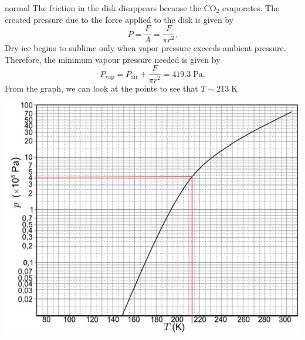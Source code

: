 \begin{solution}{normal}
The friction in the disk disappears because the $\text{CO}_2$ evaporates. The created pressure due to the force applied to the disk is given by 
\[P = \frac{F}{A} = \frac{F}{\pi r^2}.\]
Dry ice begins to sublime only when vapor pressure exceeds ambient pressure. Therefore, the minimum vapour pressure needed is given by 
\[P_{\text{vap}} = P_{\text{air}} + \frac{F}{\pi r^2} = 419.3\;\mathrm{Pa}.\]
From the graph, we can look at the points to see that $T \sim \boxed{213\;\mathrm{K}}$
\begin{center}
\includegraphics[width=15cm]{thermo78.jpeg}
\end{center}
\end{solution}